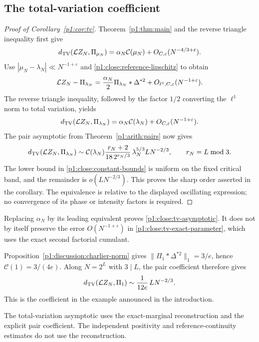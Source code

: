 \subsection{The total-variation coefficient}
\label{p14:comp:tv}

\begin{proof}[Proof of Corollary~\ref{p1:cor:tv}]
Theorem~\ref{p1:thm:main} and the reverse triangle
inequality first give
\[
 d_{\mathrm{TV}}(\mathcal L Z_N,\Pi_{\mu_N})
 =\alpha_N\mathcal C(\mu_N)
            +O_{C,\varepsilon}(N^{-4/3+\varepsilon}).
\]
Use \(|\mu_N-\lambda_N|\ll N^{-1+\varepsilon}\) and
\eqref{p1:close:reference-lipschitz} to obtain
\[
 \mathcal L Z_N-\Pi_{\lambda_N}
   =\frac{\alpha_N}{2}\Pi_{\lambda_N}*\Delta^{*2}
          +O_{\ell^1,C,\varepsilon}(N^{-1+\varepsilon}).
\]
The reverse triangle inequality, followed by the factor
$1/2$ converting the $\ell^1$ norm to total variation,
yields
\begin{equation}
 d_{\mathrm{TV}}(\mathcal L Z_N,\Pi_{\lambda_N})
      =\alpha_N\mathcal C(\lambda_N)
          +O_{C,\varepsilon}(N^{-1+\varepsilon}).
 \label{p1:close:tv-exact-parameter}
\end{equation}
The pair asymptotic from
Theorem~\ref{p1:arith:pairs} now gives
\begin{equation}
 d_{\mathrm{TV}}(\mathcal L Z_N,\Pi_{\lambda_N})
 \sim \mathcal C(\lambda_N)
       \frac{r_N+2}{18\,2^{r_N/3}}\,
       \lambda_N^{5/3}L N^{-2/3},
 \qquad r_N=L\bmod3.
 \label{p1:close:tv-asymptotic}
\end{equation}
The lower bound in \eqref{p1:close:constant-bounds} is uniform
on the fixed critical band, and the remainder is
$o(LN^{-2/3})$.  This proves the sharp order asserted in the
corollary.  The equivalence is relative to the displayed
oscillating expression; no convergence of its phase or
intensity factors is required.
\end{proof}

Replacing $\alpha_N$ by its leading equivalent proves
\eqref{p1:close:tv-asymptotic}.  It does not by itself preserve
the error $O(N^{-1+\varepsilon})$ in
\eqref{p1:close:tv-exact-parameter}, which uses the exact
second factorial cumulant.

Proposition~\ref{p1:discussion:charlier-norm} gives
$\|\Pi_1*\Delta^{*2}\|_1=3/e$, hence $\mathcal C(1)=3/(4e)$.
Along $N=2^L$ with $3\mid L$, the pair coefficient therefore gives
\begin{equation}
 d_{\mathrm{TV}}(\mathcal L Z_N,\Pi_1)
       \sim \frac1{12e}\,L N^{-2/3}.
 \label{p1:close:dyadic-example}
\end{equation}
This is the coefficient in the example announced in the introduction.

The total-variation asymptotic uses the exact-marginal reconstruction
and the explicit pair coefficient. The independent positivity and
reference-continuity estimates do not use the reconstruction.
